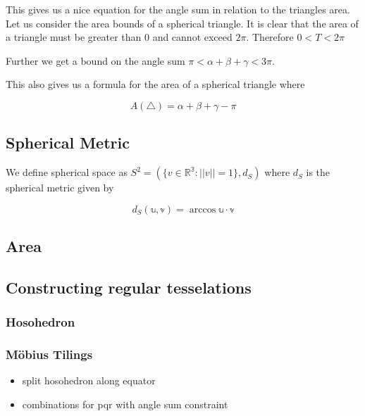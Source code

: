 This gives us a nice equation for the angle sum in relation to the
triangles area. Let us consider the area bounds of a spherical triangle.
It is clear that the area of a triangle must be greater than 0 and
cannot exceed \(2\pi\). Therefore \(0 < T < 2\pi\)

Further we get a bound on the angle sum
\(\pi < \alpha + \beta + \gamma < 3\pi\).

This also gives us a formula for the area of a spherical triangle where

\[A(\triangle) = \alpha + \beta + \gamma - \pi\]

\subsection{Spherical Metric}

We define spherical space as $S^2 = (\{v \in \mathbb{R^3} : ||v|| = 1\}, d_S)$ where $d_S$ is the spherical metric given by

\[d_S(\mathbb{u}, \mathbb{v}) = \arccos \mathbb{u} \cdot \mathbb{v}\]


\subsection{Area}


\subsection{Constructing regular
tesselations}\label{constructing-regular-tesselations}

\subsubsection{Hosohedron}\label{hosohedron}


\subsubsection{Möbius Tilings}\label{triangle-tilings}



\begin{itemize}
\tightlist
\item[$\square$]
  split hosohedron along equator
\item[$\square$]
  combinations for pqr with angle sum constraint
\end{itemize}

